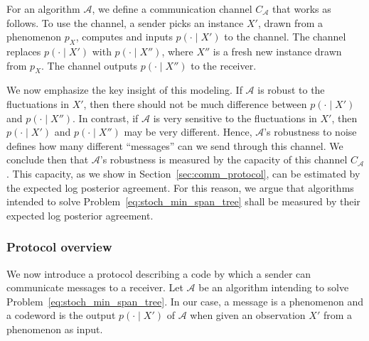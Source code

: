 For an algorithm $\mathcal{A}$, we define a communication channel $C_{\mathcal{A}}$ that works as follows. To use the channel, a sender picks an instance $X'$, drawn from a phenomenon $p_X$, computes and inputs $p(\cdot \mid X')$ to the channel. The channel replaces $p(\cdot \mid X')$ with $p(\cdot \mid X'')$, where $X''$ is a fresh new instance drawn from $p_X$. The channel outputs $p(\cdot \mid X'')$ to the receiver.

We now emphasize the key insight of this modeling. If $\mathcal{A}$ is robust to the fluctuations in $X'$, then there should not be much difference between $p(\cdot \mid X')$ and $p(\cdot \mid X'')$. In contrast, if $\mathcal{A}$ is very sensitive to the fluctuations in $X'$, then $p(\cdot \mid X')$ and $p(\cdot \mid X'')$ may be very different. Hence, $\mathcal{A}$'s robustness to noise defines how many different ``messages'' can we send through this channel. We conclude then that $\mathcal{A}$'s robustness is measured by the capacity of this channel $C_{\mathcal{A}}$. This capacity, as we show in Section~\ref{sec:comm_protocol}, can be estimated by the expected log posterior agreement. For this reason, we argue that algorithms intended to solve Problem~\ref{eq:stoch_min_span_tree} shall be measured by their expected log posterior agreement.


\subsubsection*{Protocol overview}

We now introduce a protocol describing a code by which a sender can communicate messages to a receiver. Let $\mathcal{A}$ be an algorithm intending to solve Problem~\ref{eq:stoch_min_span_tree}. In our case, a message is a phenomenon and a codeword is the output $p(\cdot \mid X')$ of $\mathcal{A}$ when given an observation $X'$ from a phenomenon as input. 

